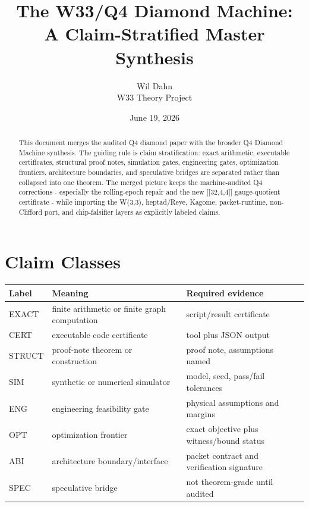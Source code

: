 \documentclass[11pt]{article}
\title{The W33/Q4 Diamond Machine:\\A Claim-Stratified Master Synthesis}
\author{Wil Dahn\\W33 Theory Project}
\date{June 19, 2026}
\begin{document}
\maketitle

\begin{abstract}
This document merges the audited Q4 diamond paper with the broader Q4 Diamond Machine synthesis. The guiding rule is claim stratification: exact arithmetic, executable certificates, structural proof notes, simulation gates, engineering gates, optimization frontiers, architecture boundaries, and speculative bridges are separated rather than collapsed into one theorem. The merged picture keeps the machine-audited Q4 corrections - especially the rolling-epoch repair and the new [[32,4,4]] gauge-quotient certificate - while importing the W(3,3), heptad/Reye, Kagome, packet-runtime, non-Clifford port, and chip-falsifier layers as explicitly labeled claims.
\end{abstract}

\tableofcontents
\newpage

\section{Claim Classes}

\begin{center}
\begin{tabular}{lll}
\toprule
Label & Meaning & Required evidence\\
\midrule
EXACT & finite arithmetic or finite graph computation & script/result certificate\\
CERT & executable code certificate & tool plus JSON output\\
STRUCT & proof-note theorem or construction & proof note, assumptions named\\
SIM & synthetic or numerical simulator & model, seed, pass/fail tolerances\\
ENG & engineering feasibility gate & physical assumptions and margins\\
OPT & optimization frontier & exact objective plus witness/bound status\\
ABI & architecture boundary/interface & packet contract and verification signature\\
SPEC & speculative bridge & not theorem-grade until audited\\
\bottomrule
\end{tabular}
\end{center}
\end{document}
